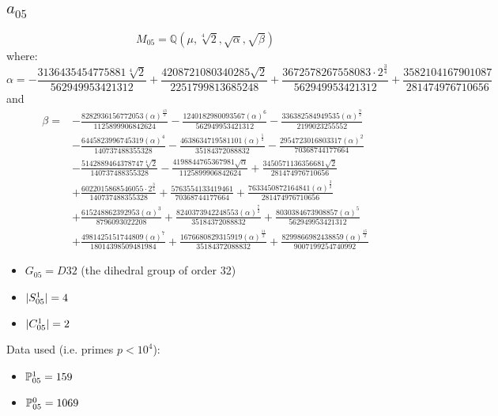 \subsection{{\huge $a_{05}$}}
$$M_{05} = \mathbb{Q}\left(\mu, \sqrt[4]{2}, \sqrt{\alpha}, \sqrt{\beta}\right)$$
where:
$$\alpha = - \frac{3136435454775881 \sqrt[4]{2}}{562949953421312} + \frac{4208721080340285 \sqrt{2}}{2251799813685248} + \frac{3672578267558083 \cdot 2^{\frac{3}{4}}}{562949953421312} + \frac{3582104167901087}{281474976710656}$$
and 
\begin{align*}
	\beta = 
	&- \frac{8282936156772053 \left(\alpha\right)^{\frac{13}{2}}}{1125899906842624} 
	- \frac{1240182980093567 \left(\alpha\right)^{6}}{562949953421312} 
	- \frac{336382584949535 \left(\alpha\right)^{\frac{9}{2}}}{2199023255552}
	\\
	&- \frac{6445823996745319 \left(\alpha\right)^{4}}{140737488355328}
	- \frac{4638634719581101 \left(\alpha\right)^{\frac{5}{2}}}{35184372088832}
	- \frac{2954723016803317 \left(\alpha\right)^{2}}{70368744177664}
	\\
	&- \frac{5142889464378747 \sqrt[4]{2}}{140737488355328}
	- \frac{4198844765367981 \sqrt{\alpha}}{1125899906842624}
	+ \frac{3450571136356681 \sqrt{2}}{281474976710656}
	\\
	&+ \frac{6022015868546055 \cdot 2^{\frac{3}{4}}}{140737488355328} 
	+ \frac{5763554133419461}{70368744177664} 
	+ \frac{7633450872164841 \left(\alpha\right)^{\frac{3}{2}}}{281474976710656} 
	\\
	&+ \frac{615248862392953 \left(\alpha\right)^{3}}{8796093022208}
	+ \frac{8240373942248553 \left(\alpha\right)^{\frac{7}{2}}}{35184372088832}
	+ \frac{8030384673908857 \left(\alpha\right)^{5}}{562949953421312}
	\\
	&+ \frac{4981425151744809 \left(\alpha\right)^{7}}{18014398509481984}
	+ \frac{1676680829315919 \left(\alpha\right)^{\frac{11}{2}}}{35184372088832}
	+ \frac{8299866982438859 \left(\alpha\right)^{\frac{15}{2}}}{9007199254740992}
\end{align*}
\begin{itemize}
	\item $G_{05} = D32$ (the dihedral group of order 32)
	\item $| S_{05}^1 | = 4$
	\item $| C_{05}^1 | = 2$
\end{itemize}
Data used (i.e. primes $p<10^4$):
\begin{itemize}
	\item $\mathbb{P}_{05}^1 = 159$
	\item $\mathbb{P}_{05}^0 = 1069$
\end{itemize}
